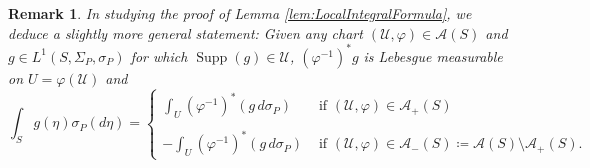 \documentclass[11pt, letter]{book}
\newtheorem{remark}{Remark}
\newcommand\supp{\operatorname{Supp}}
\begin{document}
\begin{remark}\label{rmk:LocalIntegralFormula}
In studying the proof of Lemma \ref{lem:LocalIntegralFormula}, we deduce a slightly more general statement: Given any chart $(\mathcal{U},\varphi)\in\mathcal{A}(S)$ and $g\in L^1(S,\Sigma_P,\sigma_P)$ for which $\supp(g)\in\mathcal{U}$, $(\varphi^{-1})^*g$ is Lebesgue measurable on $U=\varphi(\mathcal{U})$ and 
\begin{equation*}
    \int_S g(\eta)\sigma_P(d\eta)=\begin{cases}
    \displaystyle\int_U(\varphi^{-1})^*(g\,d\sigma_P) &\mbox{ if }(\mathcal{U},\varphi)\in\mathcal{A}_+(S)\\
    &\\
    -\displaystyle\int_U(\varphi^{-1})^*(g\,d\sigma_P)&\mbox{ if }(\mathcal{U},\varphi)\in\mathcal{A}_-(S)\coloneqq\mathcal{A}(S)\setminus\mathcal{A}_+(S).
    \end{cases}
\end{equation*}
\end{remark}
\end{document}
